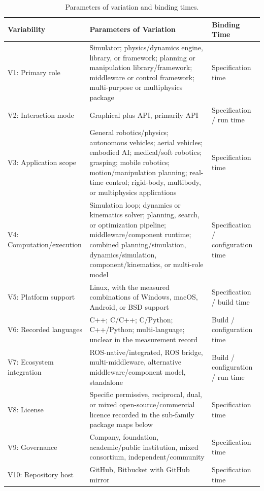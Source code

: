 \begin{table}[H]
\centering
\caption{Parameters of variation and binding times.}
\label{tab:parameters-of-variation}
\singlespacing
\small
\begin{tabular}{@{}P{3.2cm}P{7.1cm}P{3.0cm}@{}}
\toprule
\textbf{Variability} & \textbf{Parameters of Variation} & \textbf{Binding Time} \\
\midrule
V1: Primary role & Simulator; physics/dynamics engine, library, or framework; planning or manipulation library/framework; middleware or control framework; multi-purpose or multiphysics package & Specification time \\
\hline
V2: Interaction mode & Graphical plus API, primarily API & Specification / run time \\
\hline
V3: Application scope & General robotics/physics; autonomous vehicles; aerial vehicles; embodied AI; medical/soft robotics; grasping; mobile robotics; motion/manipulation planning; real-time control; rigid-body, multibody, or multiphysics applications & Specification time \\
\hline
V4: Computation/execution & Simulation loop; dynamics or kinematics solver; planning, search, or optimization pipeline; middleware/component runtime; combined planning/simulation, dynamics/simulation, component/kinematics, or multi-role model & Specification / configuration time \\
\hline
V5: Platform support & Linux, with the measured combinations of Windows, macOS, Android, or BSD support & Specification / build time \\
\hline
V6: Recorded languages & C++; C/C++; C/Python; C++/Python; multi-language; unclear in the measurement record & Build / configuration time \\
\hline
V7: Ecosystem integration & ROS-native/integrated, ROS bridge, multi-middleware, alternative middleware/component model, standalone & Build / configuration / run time \\
\hline
V8: License & Specific permissive, reciprocal, dual, or mixed open-source/commercial licence recorded in the sub-family package maps below & Specification time \\
\hline
V9: Governance & Company, foundation, academic/public institution, mixed consortium, independent/community & Specification time \\
\hline
V10: Repository host & GitHub, Bitbucket with GitHub mirror & Specification time \\
\bottomrule
\end{tabular}
\end{table}


